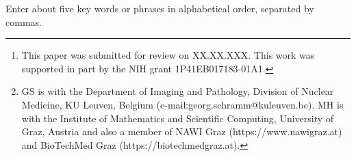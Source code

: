 \documentclass[journal,twoside,web]{ieeecolor}
\begin{document}
\title{}

\author{Georg Schramm and Martin Holler
\thanks{This paper was submitted for review on XX.XX.XXX.
This work was supported in part by the NIH grant 1P41EB017183-01A1.}
\thanks{GS is with the Department of Imaging and Pathology, Division of Nuclear Medicine,
KU Leuven, Belgium (e-mail:georg.schramm@kuleuven.be).
MH is with the Institute of Mathematics and Scientific Computing, University of Graz, Austria and
also a member of NAWI Graz (https://www.nawigraz.at) and BioTechMed Graz (https://biotechmedgraz.at).}}

\maketitle

\begin{abstract}

\end{abstract}

\begin{IEEEkeywords}
Enter about five key words or phrases in alphabetical order, separated by commas.
\end{IEEEkeywords}



\printbibliography
\end{document}
